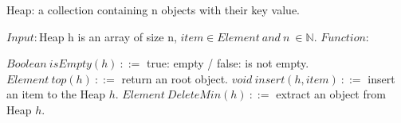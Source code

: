 \documentclass[10pt]{article}
\begin{document}
\begin{algorithm}[H]
\renewcommand{\thealgorithm}{}

\caption{Heap: a collection containing n objects with their key value.}
\label{protocol1}
\begin{algorithmic}
\STATE $Input :$\quad Heap h is an array of size n, $item \in Element\ and\ n\ \in \mathbb{N}.$
\STATE 
\STATE $Function :$ 

\STATE \qquad\qquad $Boolean\ isEmpty(h)\ ::=$ true: empty / false: is not empty.
\STATE \qquad\qquad $Element\ top(h)\ ::=$ return an root object.
\STATE \qquad\qquad $void\ insert(h, item)\ ::=$ insert an item to the Heap $h$.
\STATE \qquad\qquad $Element\ DeleteMin(h)\ ::=$ extract an object from Heap $h$.


\end{algorithmic}
\end{algorithm} 
\end{document}
